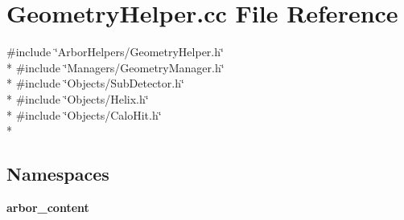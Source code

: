 \section{Geometry\+Helper.\+cc File Reference}
\label{GeometryHelper_8cc}
{\ttfamily \#include \char`\"{}Arbor\+Helpers/\+Geometry\+Helper.\+h\char`\"{}}\\*
{\ttfamily \#include \char`\"{}Managers/\+Geometry\+Manager.\+h\char`\"{}}\\*
{\ttfamily \#include \char`\"{}Objects/\+Sub\+Detector.\+h\char`\"{}}\\*
{\ttfamily \#include \char`\"{}Objects/\+Helix.\+h\char`\"{}}\\*
{\ttfamily \#include \char`\"{}Objects/\+Calo\+Hit.\+h\char`\"{}}\\*
\subsection*{Namespaces}
\begin{DoxyCompactItemize}
\item 
 {\bf arbor\+\_\+content}
\end{DoxyCompactItemize}
